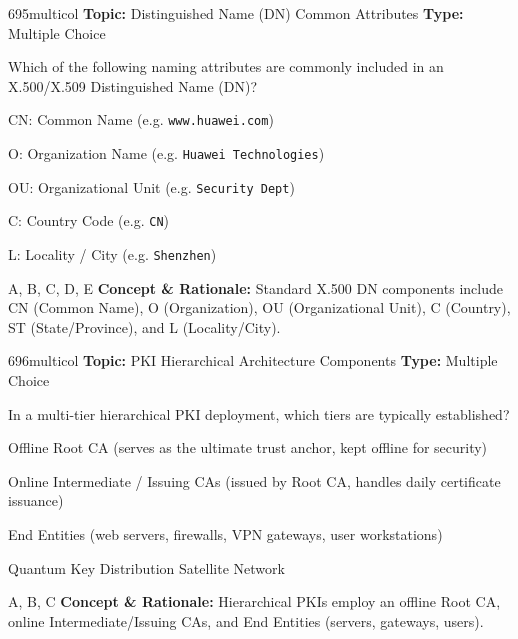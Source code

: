 \begin{qcard}{695}{multicol}
\textcolor{darkslate!75}{\small\textbf{Topic:} Distinguished Name (DN) Common Attributes \hfill \textbf{Type:} Multiple Choice}\vspace{0.4em}\par
Which of the following naming attributes are commonly included in an X.500/X.509 Distinguished Name (DN)?
\begin{qoptions}
\item CN: Common Name (e.g. \texttt{www.huawei.com})
\item O: Organization Name (e.g. \texttt{Huawei Technologies})
\item OU: Organizational Unit (e.g. \texttt{Security Dept})
\item C: Country Code (e.g. \texttt{CN})
\item L: Locality / City (e.g. \texttt{Shenzhen})
\end{qoptions}
\end{qcard}
\nopagebreak
\begin{explainbox}{A, B, C, D, E}
\textbf{Concept \& Rationale:} Standard X.500 DN components include CN (Common Name), O (Organization), OU (Organizational Unit), C (Country), ST (State/Province), and L (Locality/City).
\end{explainbox}

\begin{qcard}{696}{multicol}
\textcolor{darkslate!75}{\small\textbf{Topic:} PKI Hierarchical Architecture Components \hfill \textbf{Type:} Multiple Choice}\vspace{0.4em}\par
In a multi-tier hierarchical PKI deployment, which tiers are typically established?
\begin{qoptions}
\item Offline Root CA (serves as the ultimate trust anchor, kept offline for security)
\item Online Intermediate / Issuing CAs (issued by Root CA, handles daily certificate issuance)
\item End Entities (web servers, firewalls, VPN gateways, user workstations)
\item Quantum Key Distribution Satellite Network
\end{qoptions}
\end{qcard}
\nopagebreak
\begin{explainbox}{A, B, C}
\textbf{Concept \& Rationale:} Hierarchical PKIs employ an offline Root CA, online Intermediate/Issuing CAs, and End Entities (servers, gateways, users).
\end{explainbox}


